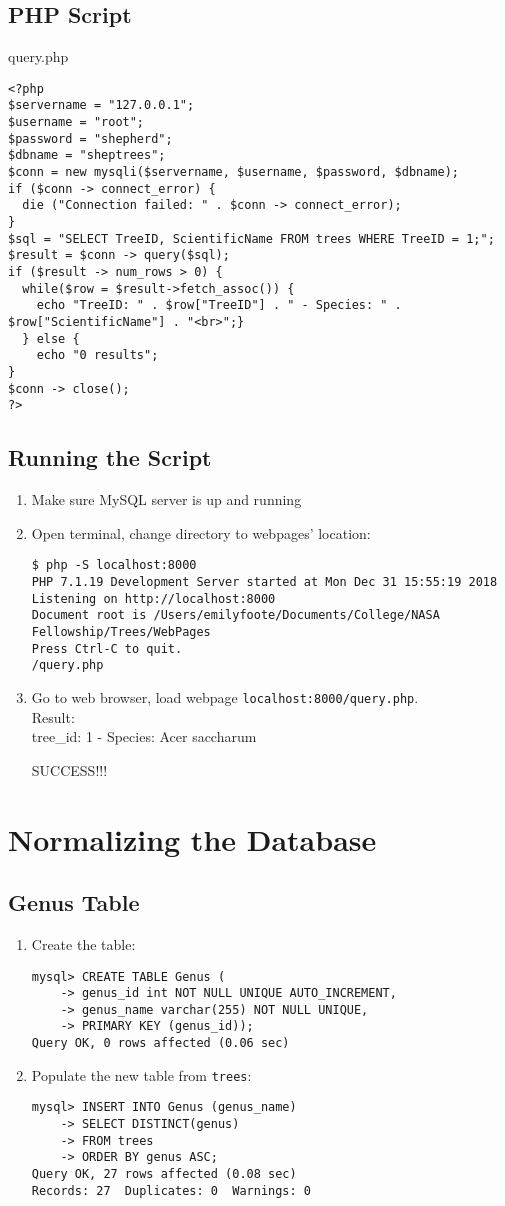 \documentclass{article}
\begin{document}
\subsection{PHP Script}
query.php
\begin{verbatim}
<?php
$servername = "127.0.0.1";
$username = "root";
$password = "shepherd";
$dbname = "sheptrees";
$conn = new mysqli($servername, $username, $password, $dbname);
if ($conn -> connect_error) {
  die ("Connection failed: " . $conn -> connect_error);
}
$sql = "SELECT TreeID, ScientificName FROM trees WHERE TreeID = 1;";
$result = $conn -> query($sql);
if ($result -> num_rows > 0) {
  while($row = $result->fetch_assoc()) {
    echo "TreeID: " . $row["TreeID"] . " - Species: " . $row["ScientificName"] . "<br>";}
  } else {
    echo "0 results";
}
$conn -> close();
?>
\end{verbatim}
\subsection{Running the Script}\begin{enumerate}
    \item Make sure MySQL server is up and running
    \item Open terminal, change directory to webpages' location:\begin{verbatim}
$ php -S localhost:8000
PHP 7.1.19 Development Server started at Mon Dec 31 15:55:19 2018
Listening on http://localhost:8000
Document root is /Users/emilyfoote/Documents/College/NASA Fellowship/Trees/WebPages
Press Ctrl-C to quit.
/query.php
\end{verbatim}
    \item Go to web browser, load webpage \texttt{localhost:8000/query.php}.\\
Result: \\
tree\_id: 1 - Species: Acer saccharum

SUCCESS!!!
\end{enumerate}

\section{Normalizing the Database}
\subsection{Genus Table}
\begin{enumerate}
    \item Create the table:\begin{verbatim}
mysql> CREATE TABLE Genus (
    -> genus_id int NOT NULL UNIQUE AUTO_INCREMENT, 
    -> genus_name varchar(255) NOT NULL UNIQUE,
    -> PRIMARY KEY (genus_id)); 
Query OK, 0 rows affected (0.06 sec)
    \end{verbatim}
\item Populate the new table from \texttt{trees}:\begin{verbatim}
mysql> INSERT INTO Genus (genus_name)
    -> SELECT DISTINCT(genus)
    -> FROM trees
    -> ORDER BY genus ASC;
Query OK, 27 rows affected (0.08 sec)
Records: 27  Duplicates: 0  Warnings: 0
\end{verbatim}
\end{enumerate}
\end{document}
